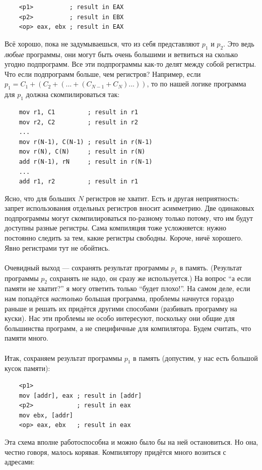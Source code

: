 \documentclass[11pt]{book}
\begin{document}
\begin{verbatim}
    <p1>          ; result in EAX
    <p2>          ; result in EBX
    <op> eax, ebx ; result in EAX
\end{verbatim}
Всё хорошо, пока не задумываешься, что из себя представляют $p_1$ и $p_2$.
Это ведь \emph{любые} программы, они могут быть очень большими и ветвиться на сколько угодно подпрограмм.
Все эти подпрограммы как-то делят между собой регистры.
Что если подпрограмм больше, чем регистров?
Например, если $p_1 = C_1 + (C_2 + (... + (C_{N - 1} + C_N)...))$, то по нашей логике программа для $p_1$ должна скомпилироваться так:
\begin{verbatim}
    mov r1, C1         ; result in r1
    mov r2, C2         ; result in r2
    ...
    mov r(N-1), C(N-1) ; result in r(N-1)
    mov r(N), C(N)     ; result in r(N)
    add r(N-1), rN     ; result in r(N-1)
    ...
    add r1, r2         ; result in r1
\end{verbatim}
Ясно, что для больших $N$ регистров не хватит.
Есть и другая неприятность: запрет использования отдельных регистров вносит асимметрию.
Две одинаковых подпрограммы могут скомпилироваться по-разному только потому, что им будут доступны разные регистры.
Сама компиляция тоже усложняется: нужно постоянно следить за тем, какие регистры свободны.
Короче, ничё хорошего.
Явно регистрами тут не обойтись.
\\ \\
Очевидный выход --- сохранять результат программы $p_1$ в память.
(Результат программы $p_2$ сохранять не надо, он сразу же используется.)
На вопрос ``а если памяти не хватит?'' я могу ответить только ``будет плохо!''.
На самом деле, если нам попадётся \emph{настолько} большая программа, проблемы начнутся гораздо раньше
и решать их придётся другими способами (разбивать программу на куски).
Нас эти проблемы не особо интересуют, поскольку они общие для большинства программ, а не специфичные для компилятора.
Будем считать, что памяти много.
\\ \\
Итак, сохраняем результат программы $p_1$ в память (допустим, у нас есть большой кусок памяти):
\begin{verbatim}
    <p1>
    mov [addr], eax ; result in [addr]
    <p2>            ; result in eax
    mov ebx, [addr]
    <op> eax, ebx   ; result in eax
\end{verbatim}
Эта схема вполне работоспособна и можно было бы на ней остановиться.
Но она, честно говоря, малось корявая.
Компилятору придётся много возиться с адресами:
\end{document}
